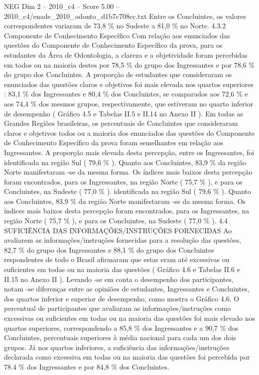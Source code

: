 \begin{textsample}{NEG Dim 2 – 2010\_c4 – Score 5.00 – 2010\_c4/enade\_2010\_odonto\_d1b7c708cc.txt}
Entre os Concluintes, os valores correspondentes variaram de 73,8 \% no Sudeste a 81,0 \% no Norte. 4.3.2 Componente de Conhecimento Específico Com relação aos enunciados das questões do Componente de Conhecimento Específico da prova, para os estudantes da Área de Odontologia, a clareza e a objetividade foram percebidas em todos ou na maioria destes por 78,5 \% do grupo dos Ingressantes e por 78,6 \% do grupo dos Concluintes.
A proporção de estudantes que consideraram os enunciados das questões claros e objetivos foi mais elevada nos quartos superiores : 83,1 \% dos Ingressantes e 80,4 \% dos Concluintes, se comparados aos 72,6 \% e aos 74,4 \% dos mesmos grupos, respectivamente, que estiveram no quarto inferior de desempenho ( Gráfico 4.5 e Tabelas II.5 e II.14 no Anexo II ).
Em todas as Grandes Regiões brasileiras, os percentuais de Concluintes que consideraram claros e objetivos todos ou a maioria dos enunciados das questões do Componente de Conhecimento Específico da prova foram semelhantes em relação aos Ingressantes.
A proporção mais elevada desta percepção, entre os Ingressantes, foi identificada na região Sul ( 79,6 \% ).
Quanto aos Concluintes, 83,9 \% da região Norte manifestaram -se da mesma forma.
Os índices mais baixos desta percepção foram encontrados, para os Ingressantes, na região Norte ( 75,7 \% ), e para os Concluintes, na Sudeste ( 77,0 \% ). identificada na região Sul ( 79,6 \% ).
Quanto aos Concluintes, 83,9 \% da região Norte manifestaram -se da mesma forma.
Os índices mais baixos desta percepção foram encontrados, para os Ingressantes, na região Norte ( 75,7 \% ), e para os Concluintes, na Sudeste ( 77,0 \% ). 4.4 SUFICIÊNCIA DAS INFORMAÇÕES/INSTRUÇÕES FORNECIDAS Ao avaliarem as informações/instruções fornecidas para a resolução das questões, 82,7 \% do grupo dos Ingressantes e 88,1 \% do grupo dos Concluintes respondentes de todo o Brasil afirmaram que estas eram até excessivas ou suficientes em todas ou na maioria das questões ( Gráfico 4.6 e Tabelas II.6 e II.15 no Anexo II ).
Levando -se em conta o desempenho dos participantes, notam -se diferenças entre as opiniões de estudantes, Ingressantes e Concluintes, dos quartos inferior e superior de desempenho, como mostra o Gráfico 4.6.
O percentual de participantes que avaliaram as informações/instruções como excessivas ou suficientes em todas ou na maioria das questões foi mais elevado nos quartos superiores, correspondendo a 85,8 \% dos Ingressantes e a 90,7 \% dos Concluintes, percentuais superiores à média nacional para cada um dos dois grupos.
Já nos quartos inferiores, a suficiência das informações/instruções declarada como excessiva em todas ou na maioria das questões foi percebida por 78.4 \% dos Ingressantes e por 84,8 \% dos Concluintes.

\end{textsample}
